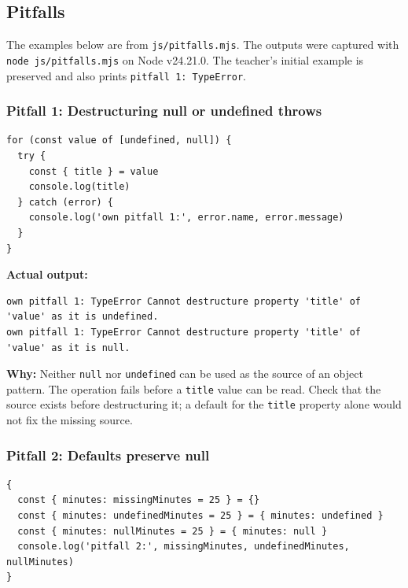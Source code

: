 \documentclass[
  11pt,
]{article}
\newcommand{\passthrough}[1]{#1}
\begin{document}
\subsection{Pitfalls}\label{pitfalls}

The examples below are from \passthrough{\lstinline!js/pitfalls.mjs!}.
The outputs were captured with
\passthrough{\lstinline!node js/pitfalls.mjs!} on Node v24.21.0. The
teacher's initial example is preserved and also prints
\passthrough{\lstinline!pitfall 1: TypeError!}.

\subsubsection{Pitfall 1: Destructuring null or undefined
throws}\label{pitfall-1-destructuring-null-or-undefined-throws}

\begin{lstlisting}
for (const value of [undefined, null]) {
  try {
    const { title } = value
    console.log(title)
  } catch (error) {
    console.log('own pitfall 1:', error.name, error.message)
  }
}
\end{lstlisting}

\textbf{Actual output:}

\begin{lstlisting}
own pitfall 1: TypeError Cannot destructure property 'title' of 'value' as it is undefined.
own pitfall 1: TypeError Cannot destructure property 'title' of 'value' as it is null.
\end{lstlisting}

\textbf{Why:} Neither \passthrough{\lstinline!null!} nor
\passthrough{\lstinline!undefined!} can be used as the source of an
object pattern. The operation fails before a
\passthrough{\lstinline!title!} value can be read. Check that the source
exists before destructuring it; a default for the
\passthrough{\lstinline!title!} property alone would not fix the missing
source.

\subsubsection{Pitfall 2: Defaults preserve
null}\label{pitfall-2-defaults-preserve-null}

\begin{lstlisting}
{
  const { minutes: missingMinutes = 25 } = {}
  const { minutes: undefinedMinutes = 25 } = { minutes: undefined }
  const { minutes: nullMinutes = 25 } = { minutes: null }
  console.log('pitfall 2:', missingMinutes, undefinedMinutes, nullMinutes)
}
\end{lstlisting}
\end{document}

